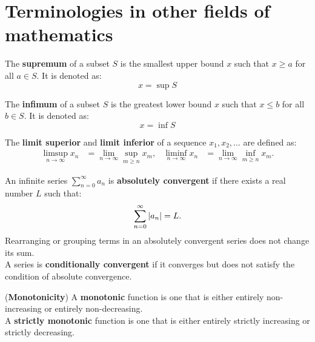 \documentclass{huhtakm-template-book}
\begin{document}
\chapter{Terminologies in other fields of mathematics}
    \begin{defn}
        The \textbf{supremum} of a subset $S$ is the smallest upper bound $x$ such that $x\geq a$ for all $a \in S$. It is denoted as:
        \begin{equation*}
            x=\sup S
        \end{equation*}
    \end{defn}
    \begin{defn}
        The \textbf{infimum} of a subset $S$ is the greatest lower bound $x$ such that $x\leq b$ for all $b \in S$. It is denoted as:
        \begin{equation*}
            x=\inf S
        \end{equation*}
    \end{defn}
    \begin{defn}
        The \textbf{limit superior} and \textbf{limit inferior} of a sequence $x_{1},x_{2},\dots$ are defined as:
        \begin{align*}
            \limsup_{n\to\infty}x_{n}&=\lim_{n\to\infty}\sup_{m\geq n}x_{m}, & \liminf_{n\to\infty}x_{n}&=\lim_{n\to\infty}\inf_{m\geq n}x_{m}.
        \end{align*}
    \end{defn}
    \begin{defn}
        An infinite series $\sum_{n=0}^{\infty}a_{n}$ is \textbf{absolutely convergent} if there exists a real number $L$ such that:
        \begin{equation*}
            \sum_{n=0}^{\infty}\left|{a_{n}}\right|=L.
        \end{equation*}
        Rearranging or grouping terms in an absolutely convergent series does not change its sum.\\
        A series is \textbf{conditionally convergent} if it converges but does not satisfy the condition of absolute convergence.
    \end{defn}
    \begin{defn}(\textbf{Monotonicity})
        A \textbf{monotonic} function is one that is either entirely non-increasing or entirely non-decreasing.\\
        A \textbf{strictly monotonic} function is one that is either entirely strictly increasing or strictly decreasing.
    \end{defn}
\end{document}
